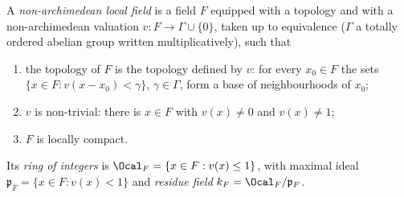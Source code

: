 A \emph{non-archimedean local field} is a field $F$ equipped with a topology and with a non-archimedean
valuation $v\colon F\to\Gamma\cup\{0\}$, taken up to equivalence ($\Gamma$ a totally ordered abelian group written
multiplicatively), such that
\begin{enumerate}[label=(\roman*)]
\item the topology of $F$ is the topology defined by $v$: for every $x_0\in F$ the sets
  $\{x\in F:v(x-x_0)<\gamma\}$, $\gamma\in\Gamma$, form a base of neighbourhoods of $x_0$;
\item $v$ is non-trivial: there is $x\in F$ with $v(x)\neq0$ and $v(x)\neq1$;
\item $F$ is locally compact.
\end{enumerate}
Its \emph{ring of integers} is $\Ocal_F=\{x\in F:v(x)\le1\}$, with maximal ideal
$\mathfrak{p}_F=\{x\in F:v(x)<1\}$ and \emph{residue field} $k_F=\Ocal_F/\mathfrak{p}_F$.
